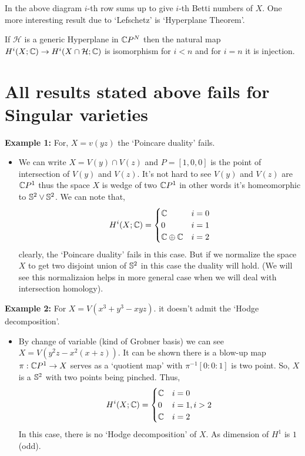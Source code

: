 \documentclass[11pt]{article}
\begin{document}
\noindent In the above diagram $i$-th row sums up to give $i$-th Betti numbers of $X$. One more interesting result due to `Lefschetz' is `Hyperplane Theorem'.

\begin{Thm}{}{}
    If $\mathcal{H}$ is a generic Hyperplane in $\mathbb{C} P^N$ then the natural map $H^i(X;\mathbb{C}) \to H^i(X\cap \mathcal{H};\mathbb{C})$ is isomorphism for $i<n$ and for $i=n$ it is injection. 
\end{Thm}

\section{All results stated above fails for Singular varieties}

\textbf{Example 1:} For, $X = v(yz)$ the `Poincare duality' fails.
\begin{itemize}
    \item[] We can write $X= V(y)\cap V(z)$ and $P =[1,0,0]$ is the point of intersection of $V(y)$ and $V(z)$. It's not hard to see $V(y)$ and $V(z)$ are $\mathbb{C} P^1$ thus the space $X$ is wedge of two $\mathbb{C} P^1$ in other words it's homeomorphic to $\mathbb{S}^2 \vee \mathbb{S}^2$. We can note that,\[H^i(X;\mathbb{C})=\begin{cases}
        \mathbb{C} & i=0\\
        0 & i=1 \\
        \mathbb{C} \oplus \mathbb{C} & i=2 
        \end{cases}\]
    clearly, the `Poincare duality' fails in this case. But if we normalize the space $X$ to get two disjoint union of $\mathbb{S}^2$ in this case the duality will hold. (We will see this normalizaion helps in more general case when we will deal with intersection homology).    
\end{itemize}
\textbf{Example 2:} For $X = V(x^3+y^3-xyz)$. it doesn't admit the `Hodge decomposition'.
\begin{itemize}
    \item[] By change of variable (kind of Grobner basis) we can see $X= V(y^2z-x^2(x+z))$. It can be shown there is a blow-up map $\pi :\mathbb{C} P^1\to X$ serves as a `quotient map' with $\pi^{-1}{[0:0:1]}$ is two point. So, $X$ is a $\mathbb{S}^2$ with two points being pinched. Thus, \[H^i(X;\mathbb{C})=\begin{cases}
        \mathbb{C} & i=0\\
        0 & i=1, i>2 \\
        \mathbb{C}  & i=2 
        \end{cases}\]
    In this case, there is no `Hodge decomposition' of $X$. As dimension of $H^1$ is $1$(odd).
\end{itemize}
\end{document}
